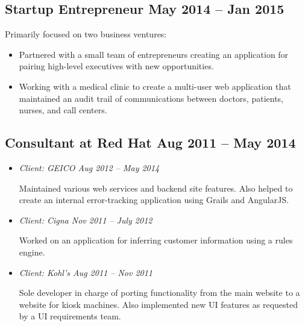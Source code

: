 \documentclass[12pt]{article}
\begin{document}
    

\subsection*{Startup Entrepreneur \hfill May 2014 -- Jan 2015}

Primarily focused on two business ventures:

\begin{itemize}
\item Partnered with a small team of entrepreneurs creating an application for
  pairing high-level executives with new opportunities.

\item Working with a medical clinic to create a multi-user web application that
  maintained an audit trail of communications between doctors, patients, nurses,
  and call centers.
\end{itemize}

     
\tag{\LaTeX}

\subsection*{Consultant at Red Hat \hfill Aug 2011 -- May 2014}

\begin{itemize}
\item \textit{Client: GEICO \hfill Aug 2012 -- May 2014}

  Maintained various web services and backend site features. Also helped to
  create an internal error-tracking application using Grails and AngularJS.

       

\item \textit{Client: Cigna \hfill Nov 2011 -- July 2012}

  Worked on an application for inferring customer information using a rules
  engine.

   

\item \textit{Client: Kohl's \hfill Aug 2011 -- Nov 2011}

  Sole developer in charge of porting functionality from the main website to a
  website for kiosk machines. Also implemented new UI features as requested by a
  UI requirements team.

   
\end{itemize}
\end{document}
